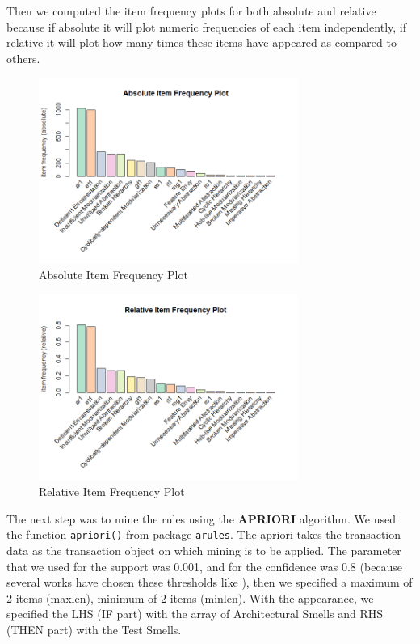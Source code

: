 Then we computed the item frequency plots for both absolute and relative because if absolute it will plot numeric frequencies of each item independently, if relative it will plot how many times these items have appeared as compared to others. 
\begin{figure}[htp]
    \centering
    \includegraphics[width=8.5cm]{img/absoluteItemFreq.png}
    \caption{Absolute Item Frequency Plot}
    \label{fig:absoluteItemFreq}
\end{figure}
\begin{figure}[htp]
    \centering
    \includegraphics[width=8.5cm]{img/relativeItemFreq.png}
    \caption{Relative Item Frequency Plot}
    \label{fig:relativeItemFreq}
\end{figure}

The next step was to mine the rules using the \textbf{APRIORI} algorithm. We used the function \verb|apriori()| from package \verb|arules|. The apriori takes the transaction data as the transaction object on which mining is to be applied. The parameter that we used for the support was 0.001, and for the confidence was 0.8 (because several works have chosen these thresholds  like \cite{IEEEhowto:associationRules}), then we specified a maximum of 2 items (maxlen), minimum of 2 items (minlen). With the appearance, we specified the LHS (IF part) with the array of Architectural Smells and RHS (THEN part) with the Test Smells.

